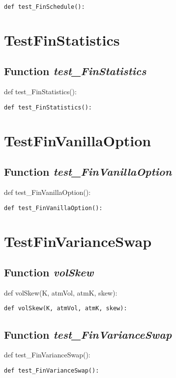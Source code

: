 \documentclass[twoside,11pt]{book}
\begin{document}
\begin{lstlisting}
def test_FinSchedule():
\end{lstlisting}


\newpage
\section{TestFinStatistics}

\subsection{Function {\it test\_FinStatistics}}
def test\_FinStatistics():

\begin{lstlisting}
def test_FinStatistics():
\end{lstlisting}


\newpage
\section{TestFinVanillaOption}

\subsection{Function {\it test\_FinVanillaOption}}
def test\_FinVanillaOption():

\begin{lstlisting}
def test_FinVanillaOption():
\end{lstlisting}


\newpage
\section{TestFinVarianceSwap}

\subsection{Function {\it volSkew}}
def volSkew(K, atmVol, atmK, skew):

\begin{lstlisting}
def volSkew(K, atmVol, atmK, skew):
\end{lstlisting}

\subsection{Function {\it test\_FinVarianceSwap}}
def test\_FinVarianceSwap():

\begin{lstlisting}
def test_FinVarianceSwap():
\end{lstlisting}
\end{document}
